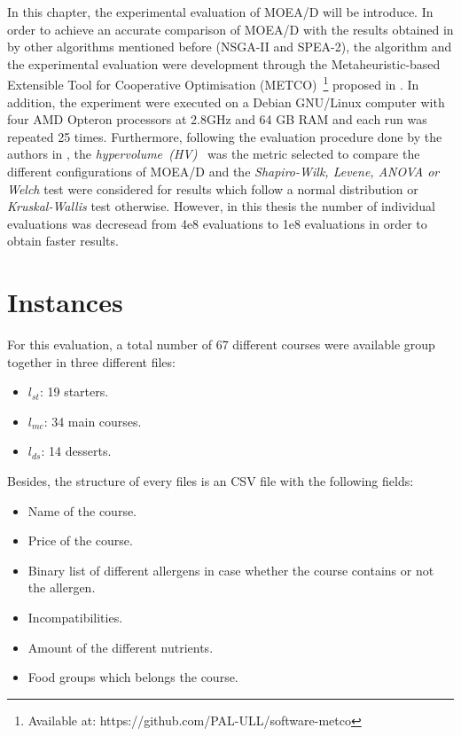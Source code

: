 In this chapter, the experimental evaluation of MOEA/D will be introduce. In order to achieve an accurate comparison of MOEA/D with the results obtained in \cite{Miranda2018} by other algorithms mentioned before (NSGA-II and SPEA-2), the algorithm and the experimental evaluation were development through the Metaheuristic-based Extensible Tool for Cooperative Optimisation (METCO)~\footnote{Available at: https://github.com/PAL-ULL/software-metco} proposed in \cite{METCO}.
In addition, the experiment were executed on a Debian GNU/Linux computer with four AMD Opteron processors at 2.8GHz and 64 GB RAM and each run was repeated 25 times.
Furthermore, following the evaluation procedure done by the authors in \cite{Miranda2018}, the \textit{hypervolume~(HV)}~\cite{HYPER} was the metric selected to compare the different configurations of MOEA/D and the \textit{Shapiro-Wilk, Levene, ANOVA or Welch} test were considered for results which follow a normal distribution or \textit{Kruskal-Wallis} test otherwise. However, in this thesis the number of individual evaluations was decresead from 4e8 evaluations to 1e8 evaluations in order to obtain faster results.
\section{Instances}
For this evaluation, a total number of 67 different courses were available group together in three different files:
\begin{itemize}
    \item $l_{st}$: 19 starters.
    \item $l_{mc}$: 34 main courses.
    \item $l_{ds}$: 14 desserts.
\end{itemize}
Besides, the structure of every files is an CSV file with the following fields:
\begin{itemize}
    \item Name of the course.
    \item Price of the course.
    \item Binary list of different allergens in case whether the course contains or not the allergen.
    \item Incompatibilities.
    \item Amount of the different nutrients.
    \item Food groups which belongs the course.
\end{itemize}
